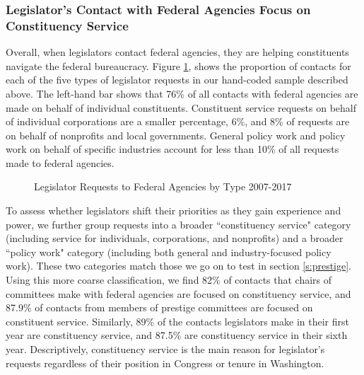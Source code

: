 \documentclass[12pt]{article}
\begin{document}
\subsubsection{Legislator's Contact with Federal Agencies Focus on Constituency Service}
Overall, when legislators contact federal agencies, they are helping constituents navigate the federal bureaucracy. Figure \ref{f:type2}, shows the proportion of contacts for each of the five types of legislator requests in our hand-coded sample described above. 
The left-hand bar shows that 76\% of all contacts with federal agencies are made on behalf of individual constituents. Constituent service requests on behalf of individual corporations are a smaller percentage, 6\%, and 8\% of requests are on behalf of nonprofits and local governments. General policy work and policy work on behalf of specific industries account for less than 10\% of all requests made to federal agencies.  


\begin{figure}[hbt!]
\centering
\caption{Legislator Requests to Federal Agencies by Type 2007-2017} \label{f:type2}
\end{figure}



To assess whether legislators shift their priorities as they gain experience and power, we further group requests into a broader ``constituency service"  category (including service for individuals, corporations, and nonprofits) and a broader ``policy work" category (including both general and industry-focused policy work). These two categories match those we go on to test in section \ref{s:prestige}. Using this more coarse classification, we find 82\% of contacts that chairs of committees make with federal agencies are focused on constituency service, and 87.9\% of contacts from members of prestige committees are focused on constituent service. Similarly, 89\% of the contacts legislators make in their first year are constituency service, and 87.5\% are constituency service in their sixth year. Descriptively, constituency service is the main reason for legislator's requests regardless of their position in Congress or tenure in Washington. 
\end{document}
